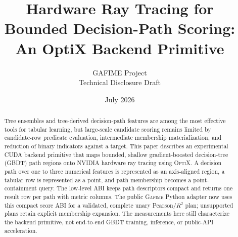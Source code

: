 \documentclass[11pt]{article}
\title{Hardware Ray Tracing for Bounded Decision-Path Scoring:\\An OptiX Backend Primitive}
\author{GAFIME Project\\Technical Disclosure Draft}
\date{July 2026}
\newcommand{\gafime}{\textsc{Gafime}\xspace}
\newcommand{\optix}{\textsc{OptiX}\xspace}
\begin{document}
\maketitle

\begin{abstract}
Tree ensembles and tree-derived decision-path features are among the most
effective tools for tabular learning, but large-scale candidate scoring remains
limited by candidate-row predicate evaluation, intermediate membership
materialization, and reduction of binary indicators against a target. This
paper describes an experimental CUDA backend primitive that maps bounded,
shallow gradient-boosted decision-tree (GBDT) path regions onto NVIDIA hardware
ray tracing using \optix. A decision path over one to three numerical features
is represented as an axis-aligned region, a tabular row is represented as a
point, and path membership becomes a point-containment query. The low-level ABI
keeps path descriptors compact and returns one result row per path with metric
columns. The public \gafime Python adapter now uses this compact score ABI for a
validated, complete unary Pearson/$R^2$ plan; unsupported plans retain explicit
membership expansion. The measurements here still characterize the backend
primitive, not end-to-end GBDT training, inference, or public-API acceleration.


\end{abstract}
\end{document}
